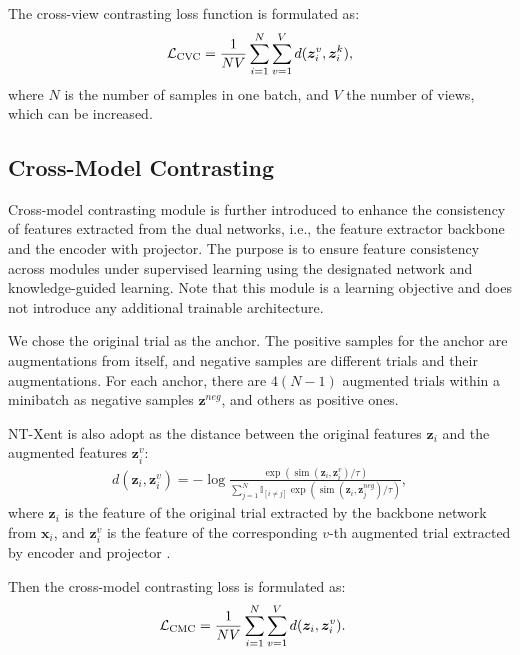 \documentclass[journal]{IEEEtran}
\begin{document}
The cross-view contrasting loss function is formulated as:
\begin{align}
\mathcal{L}_\textmd{CVC} = \dfrac{1}{NV} \sum_{i=1}^{N} \sum_{v=1}^{V} d(\boldsymbol{z}_{i}^{v}, \boldsymbol{z}_{i}^{k}), \label{eq:cvc_loss}
\end{align}
where $N$ is the number of samples in one batch, and $V$ the number of views, which can be increased.

\subsection{Cross-Model Contrasting}
Cross-model contrasting module is further introduced to enhance the consistency of features extracted from the dual networks, i.e., the feature extractor backbone and the encoder with projector. The purpose is to ensure feature consistency across modules under supervised learning using the designated network and knowledge-guided learning. Note that this module is a learning objective and does not introduce any additional trainable architecture.

We chose the original trial as the anchor. The positive samples for the anchor are augmentations from itself, and negative samples are different trials and their augmentations. For each anchor, there are $4(N-1)$ augmented trials within a minibatch as negative samples $\boldsymbol{z}^{neg}$, and others as positive ones.

NT-Xent is also adopt as the distance between the original features $\boldsymbol{z}_i$ and the augmented features $\boldsymbol{z}_i^{v}$:
\begin{align}
d(\boldsymbol{z}_i, \boldsymbol{z}_i^{v})=-\log \frac{\exp \left(\operatorname{sim}\left(\boldsymbol{z}_{i}, \boldsymbol{z}_{i}^{v}\right) / \tau\right)}{\sum_{j=1}^{N} \mathbb{I}_{[i \neq j]} \exp \left(\operatorname{sim} \left(\boldsymbol{z}_{i}, \boldsymbol{z}_{j}^{neg}\right) / \tau \right)}, \label{eq:TSFC}
\end{align}
where $\boldsymbol{z}_i$ is the feature of the original trial extracted by the backbone network from $\mathbf{x}_i$, and $\boldsymbol{z}_i^{v}$ is the feature of the corresponding $v$-th augmented trial extracted by encoder and projector .

Then the cross-model contrasting loss is formulated as:
\begin{align}
\mathcal{L}_\textmd{CMC}&=\dfrac{1}{NV} \sum_{i=1}^{N} \sum_{v=1}^{V} d(\boldsymbol{z}_i, \boldsymbol{z}_i^{v}). \label{eq:cmc_loss}
\end{align}
\end{document}
